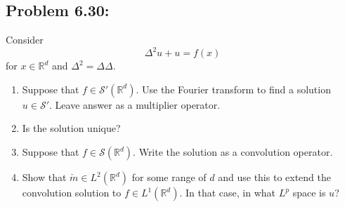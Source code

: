 \documentclass[letterpaper,twoside,11pt]{article}
\theoremstyle{mystyle}
\newcommand{\R}{{\mathbb R}}
\newcommand{\cred}{\color{red}}
\newcommand{\sch}{\mathcal S}
\begin{document}
\cred 
\subsection*{Problem 6.30:}
Consider 
\[\Delta^2 u + u = f(x)\] 
for $x\in \R^d$ and $\Delta^2 = \Delta\Delta$. 
\begin{enumerate}
  \item Suppose that $f \in \sch ' \left( \R^d  \right)$. Use the Fourier transform to find a solution $u \in \sch'$. Leave answer as a multiplier operator. 
  \item Is the solution unique? 
  \item Suppose that $f \in \sch \left( \R^d  \right)$. Write the solution as a convolution operator. 
  \item Show that $\check{m}\in L^2 \left( \R^d \right)$ for some range of $d$ and use this to extend the convolution solution to $f\in L^1\left( \R^d \right)$. In that case, in what $L^p$ space is $u$? 
\end{enumerate}
\end{document}
